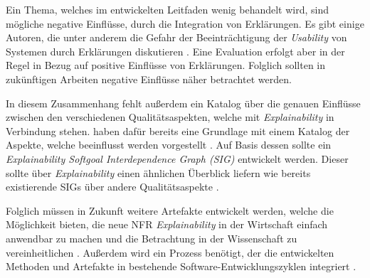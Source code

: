 Ein Thema, welches im entwickelten Leitfaden wenig behandelt wird, sind mögliche negative Einflüsse, durch die Integration von Erklärungen. Es gibt einige Autoren, die unter anderem die Gefahr der Beeinträchtigung der \textit{Usability} von Systemen durch Erklärungen diskutieren \cite{chazette_knowledge_nodate,koo_understanding_2016,kohl_explainability_2019}. Eine Evaluation erfolgt aber in der Regel in Bezug auf positive Einflüsse von Erklärungen. Folglich sollten in zukünftigen Arbeiten negative Einflüsse näher  betrachtet werden.

In diesem Zusammenhang fehlt außerdem ein Katalog über die genauen Einflüsse zwischen den verschiedenen Qualitätsaspekten, welche mit \textit{Explainability} in Verbindung stehen. \citeauthor{chazette_knowledge_nodate} haben dafür bereits eine Grundlage mit einem Katalog der Aspekte, welche beeinflusst werden vorgestellt \cite{chazette_knowledge_nodate}. Auf Basis dessen sollte ein \textit{Explainability Softgoal Interdependence Graph (SIG)} entwickelt werden. Dieser sollte über \textit{Explainability} einen ähnlichen Überblick liefern wie bereits existierende SIGs über andere Qualitätsaspekte \cite[vgl.][]{do2010software, carvalho2020developers}.

Folglich müssen in Zukunft weitere Artefakte entwickelt werden, welche die Möglichkeit bieten, die neue NFR \textit{Explainability} in der Wirtschaft einfach anwendbar zu machen und die Betrachtung in der Wissenschaft zu vereinheitlichen \cite{sokol_explainability_2020}. Außerdem wird ein Prozess benötigt, der die entwickelten Methoden und Artefakte in bestehende Software-Entwicklungszyklen integriert \cite{kohl_explainability_2019, cassens_ambient_2019}.

